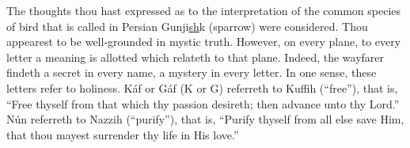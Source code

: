\documentclass[12pt]{article}
\begin{document}
\vspace{2ex}
 {
The thoughts thou hast expressed as to the interpretation of the common species of bird that is called in Persian Gunji\underline{sh}k (sparrow) were considered.\footnotemark[52]
}
\vspace{2ex}
 {
Thou appearest to be well-grounded in mystic truth.
}
\vspace{2ex}
 {
However, on every plane, to every letter a meaning is allotted which relateth to that plane.
}
\vspace{2ex}
 {
Indeed, the wayfarer findeth a secret in every name, a mystery in every letter.
}
\vspace{2ex}
 {
In one sense, these letters refer to holiness.
}
\vspace{2ex}
 {
K\'{a}f or G\'{a}f (K or G) referreth to Kuffih (``free''), that is, ``Free thyself from that which thy passion desireth; then advance unto thy Lord.''
}
\vspace{2ex}
 {
N\'{u}n referreth to Nazzih (``purify''), that is, ``Purify thyself from all else save Him, that thou mayest surrender thy life in His love.''
}
\end{document}
